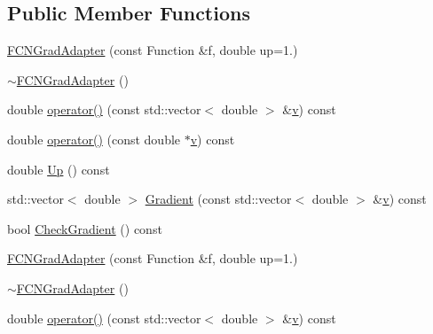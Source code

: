 \subsection*{Public Member Functions}
\begin{DoxyCompactItemize}
\item 
\mbox{\hyperlink{classROOT_1_1Minuit2_1_1FCNGradAdapter_a1836db737b7f09a9acc99b9206abed81}{F\+C\+N\+Grad\+Adapter}} (const Function \&f, double up=1.)
\item 
\mbox{\hyperlink{classROOT_1_1Minuit2_1_1FCNGradAdapter_a7b15e8e6baa870bc150e04cb4a5ad946}{$\sim$\+F\+C\+N\+Grad\+Adapter}} ()
\item 
double \mbox{\hyperlink{classROOT_1_1Minuit2_1_1FCNGradAdapter_a101e87d4c03ae367b24227b41bb258c4}{operator()}} (const std\+::vector$<$ double $>$ \&\mbox{\hyperlink{adat__devel_2lib_2hadron_2hadron__timeslice_8cc_a716fc87f5e814be3ceee2405ed6ff22a}{v}}) const
\item 
double \mbox{\hyperlink{classROOT_1_1Minuit2_1_1FCNGradAdapter_a3e3916bd20059d8e4a3f4938864ac2d7}{operator()}} (const double $\ast$\mbox{\hyperlink{adat__devel_2lib_2hadron_2hadron__timeslice_8cc_a716fc87f5e814be3ceee2405ed6ff22a}{v}}) const
\item 
double \mbox{\hyperlink{classROOT_1_1Minuit2_1_1FCNGradAdapter_a99e41f07b3f7374c0b17ef42f1c15a19}{Up}} () const
\item 
std\+::vector$<$ double $>$ \mbox{\hyperlink{classROOT_1_1Minuit2_1_1FCNGradAdapter_ae91d0453fd5e953f75551576659d6c7b}{Gradient}} (const std\+::vector$<$ double $>$ \&\mbox{\hyperlink{adat__devel_2lib_2hadron_2hadron__timeslice_8cc_a716fc87f5e814be3ceee2405ed6ff22a}{v}}) const
\item 
bool \mbox{\hyperlink{classROOT_1_1Minuit2_1_1FCNGradAdapter_a10faf0c868284a440f291465b7efd08e}{Check\+Gradient}} () const
\item 
\mbox{\hyperlink{classROOT_1_1Minuit2_1_1FCNGradAdapter_a1836db737b7f09a9acc99b9206abed81}{F\+C\+N\+Grad\+Adapter}} (const Function \&f, double up=1.)
\item 
\mbox{\hyperlink{classROOT_1_1Minuit2_1_1FCNGradAdapter_a7b15e8e6baa870bc150e04cb4a5ad946}{$\sim$\+F\+C\+N\+Grad\+Adapter}} ()
\item 
double \mbox{\hyperlink{classROOT_1_1Minuit2_1_1FCNGradAdapter_a101e87d4c03ae367b24227b41bb258c4}{operator()}} (const std\+::vector$<$ double $>$ \&\mbox{\hyperlink{adat__devel_2lib_2hadron_2hadron__timeslice_8cc_a716fc87f5e814be3ceee2405ed6ff22a}{v}}) const
\item 

\end{DoxyCompactItemize}
